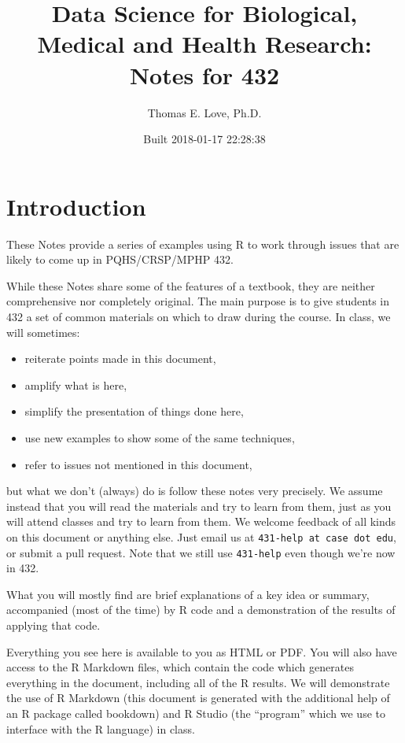 \documentclass[]{book}
\title{Data Science for Biological, Medical and Health Research: Notes for 432}
\author{Thomas E. Love, Ph.D.}
\date{Built 2018-01-17 22:28:38}
\providecommand{\tightlist}{%
  \setlength{\itemsep}{0pt}\setlength{\parskip}{0pt}}
\theoremstyle{definition}
\theoremstyle{definition}
\theoremstyle{definition}
\theoremstyle{remark}
\begin{document}
\maketitle

{
\setcounter{tocdepth}{1}
\tableofcontents
}
\chapter*{Introduction}\label{introduction}

These Notes provide a series of examples using R to work through issues
that are likely to come up in PQHS/CRSP/MPHP 432.

While these Notes share some of the features of a textbook, they are
neither comprehensive nor completely original. The main purpose is to
give students in 432 a set of common materials on which to draw during
the course. In class, we will sometimes:

\begin{itemize}
\tightlist
\item
  reiterate points made in this document,
\item
  amplify what is here,
\item
  simplify the presentation of things done here,
\item
  use new examples to show some of the same techniques,
\item
  refer to issues not mentioned in this document,
\end{itemize}

but what we don't (always) do is follow these notes very precisely. We
assume instead that you will read the materials and try to learn from
them, just as you will attend classes and try to learn from them. We
welcome feedback of all kinds on this document or anything else. Just
email us at \texttt{431-help\ at\ case\ dot\ edu}, or submit a pull
request. Note that we still use \texttt{431-help} even though we're now
in 432.

What you will mostly find are brief explanations of a key idea or
summary, accompanied (most of the time) by R code and a demonstration of
the results of applying that code.

Everything you see here is available to you as HTML or PDF. You will
also have access to the R Markdown files, which contain the code which
generates everything in the document, including all of the R results. We
will demonstrate the use of R Markdown (this document is generated with
the additional help of an R package called bookdown) and R Studio (the
``program'' which we use to interface with the R language) in class.
\end{document}
